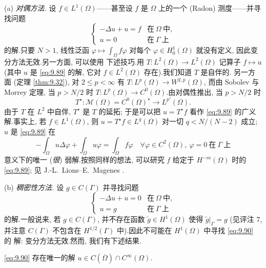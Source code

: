 \noindent (a) \emph{对偶方法.} 设 $f\in L^1(\Omega)$——甚至设 $f$ 是
$\Omega$ 上的一个 (Radon) 测度——并寻找问题
\begin{equation}
\begin{cases}
-\Delta u+u=f & \text{在}\ \Omega\ \text{中},\\
u=0 & \text{在}\ \Gamma\ \text{上}
\end{cases}
\label{eq:9.89}
\end{equation}
的解.只要 $N>1$, 线性泛函 $\varphi\mapsto\int_\Omega f\varphi$ 对每个
$\varphi\in H_0^1(\Omega)$ 就没有定义, 因此变分方法无效.另一方面, 可以使用
下述技巧.用 $T:L^2(\Omega)\to L^2(\Omega)$ 记算子 $f\mapsto u$ (其中 $u$ 是
\eqref{eq:9.89} 的解, 它对 $f\in L^2(\Omega)$ 存在).我们知道 $T$ 是自伴的.
另一方面 (定理  \ref{thm:9.32}), 对 $2\le p<\infty$ 有
$T:L^p(\Omega)\to W^{2,p}(\Omega)$, 而由 Sobolev 与 Morrey 定理, 当
$p>N/2$ 时 $T:L^p(\Omega)\to C^0(\Omega)$.由对偶性推出, 当 $p>N/2$ 时
\begin{equation*}
T^\star:\mathcal M(\Omega)=C^0(\Omega)^\star\to L^{p'}(\Omega).
\end{equation*}
由于 $T$ 在 $L^2$ 中自伴, $T^\star$ 是 $T$ 的延拓; 于是可以把
$u=T^\star f$ 看作 \eqref{eq:9.89} 的广义解.事实上, 若
$f\in L^1(\Omega)$, 则 $u=T^\star f\in L^q(\Omega)$ 对一切
$q<N/(N-2)$ 成立; $u$ 是 \eqref{eq:9.89} 在
\begin{equation*}
-\int_\Omega u\Delta\varphi+\int_\Omega u\varphi=\int_\Omega f\varphi
\quad\forall\varphi\in C^2(\Omega),\ \varphi=0\ \text{在}\ \Gamma\ \text{上}
\end{equation*}
意义下的唯一 (\emph{很}) 弱解.按照同样的想法, 可以研究 $f$ 给定于
$H^{-m}(\Omega)$ 时的 \eqref{eq:9.89}; 见 J.-L.~Lions--E.~Magenes
.

\noindent (b) \emph{稠密性方法.} 设 $g\in C(\Gamma)$ 并寻找问题
\begin{equation}
\begin{cases}
-\Delta u+u=0 & \text{在}\ \Omega\ \text{中},\\
u=g & \text{在}\ \Gamma\ \text{上}
\end{cases}
\label{eq:9.90}
\end{equation}
的解.一般说来, 若 $g\in C(\Gamma)$, 并不存在函数 $\tilde g\in H^1(\Omega)$
使得 $\tilde g|_\Gamma=g$ (见评注 7, 并注意 $C(\Gamma)$ 不包含在
$H^{1/2}(\Gamma)$ 中).因此不可能在 $H^1(\Omega)$ 中寻找 \eqref{eq:9.90} 的
解: 变分方法无效.然而, 我们有下述结果.

\begin{keytheorem}
\label{thm:9.35}
\eqref{eq:9.90} 存在唯一的解 $u\in C(\overline\Omega)\cap C^\infty(\Omega)$.
\end{keytheorem}

